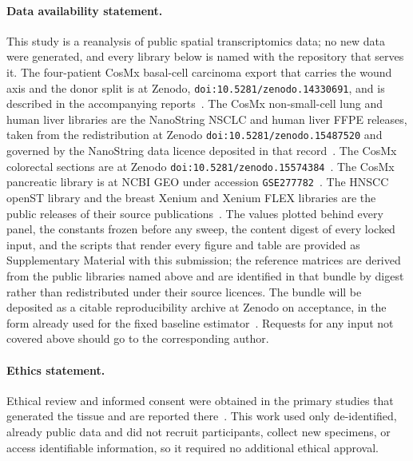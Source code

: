 \paragraph{Data availability statement.}
This study is a reanalysis of public spatial transcriptomics data; no new data were
generated, and every library below is named with the repository that serves it. The
four-patient CosMx basal-cell carcinoma export that carries the wound axis and the donor
split is at Zenodo, \texttt{doi:10.5281/zenodo.14330691}, and is described in the
accompanying reports~\citep{Andreatta2024zenodo,Yerly2022,Yerly2025preprint}. The CosMx
non-small-cell lung and human liver libraries are the NanoString NSCLC and human liver
FFPE releases, taken from the redistribution at Zenodo
\texttt{doi:10.5281/zenodo.15487520} and governed by the NanoString data licence
deposited in that record~\citep{He2022,Sun2025spatial}. The CosMx colorectal sections are
at Zenodo \texttt{doi:10.5281/zenodo.15574384}~\citep{Crowell2025preprint}. The CosMx
pancreatic library is at NCBI GEO under accession
\texttt{GSE277782}~\citep{Pei2025}. The HNSCC openST library and the breast Xenium and
Xenium FLEX libraries are the public releases of their source
publications~\citep{Schott2024,Janesick2023}. The values plotted behind every panel, the
constants frozen before any sweep, the content digest of every locked input, and the
scripts that render every figure and table are provided as Supplementary Material with
this submission; the reference matrices are derived from the public libraries named
above and are identified in that bundle by digest rather than redistributed under their
source licences. The bundle will be deposited as a citable reproducibility archive at
Zenodo on acceptance, in the form already used for the fixed baseline
estimator~\citep{Fu2026spgd}. Requests for any input not covered above should go to the
corresponding author.

\paragraph{Ethics statement.}
Ethical review and informed consent were obtained in the primary studies that generated
the tissue and are reported there~\citep{Yerly2022,Yerly2025preprint,He2022,Janesick2023,Schott2024,Crowell2025preprint,Pei2025}.
This work used only de-identified, already public data and did not recruit participants,
collect new specimens, or access identifiable information, so it required no additional
ethical approval.


